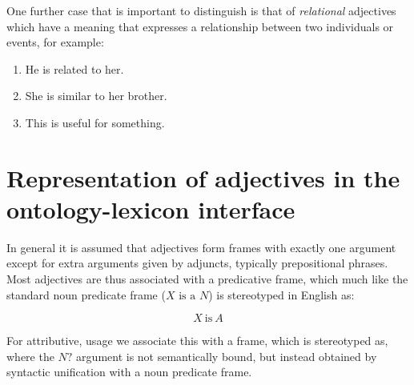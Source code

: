 \documentclass[11pt]{article}
\begin{document}
One further case that is important to distinguish is that of \emph{relational} adjectives which have a meaning 
that expresses a relationship between two individuals or events, for example:

\begin{enumerate}
\item He is related to her.
\item She is similar to her brother. 
\item This is useful for something. 
\end{enumerate}


\section{Representation of adjectives in the ontology-lexicon interface}

In general it is assumed that adjectives form frames with exactly one argument 
except for extra arguments given by adjuncts, typically prepositional phrases. 
Most adjectives are thus associated with a predicative frame, which much
like the standard noun predicate frame ($X\text{ is a }N$) is stereotyped in English as:

\vspace{-1.0em}
$$X\mathrm{~is~}A$$
\vspace{-1.5em}

For attributive, usage we associate this with a frame, which is stereotyped as,
where the $N?$ argument is not semantically bound, but instead obtained by
syntactic unification with a noun predicate frame.
\end{document}
